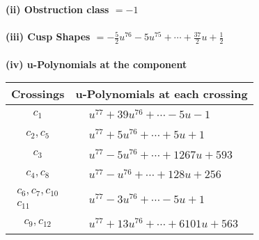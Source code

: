 \documentclass[1p]{elsarticle_modified}
\theoremstyle{definition}
\begin{document}
\flushleft \textbf{(ii) Obstruction class $= -1$}\\~\\
\flushleft \textbf{(iii) Cusp Shapes $= -\frac{5}{2} u^{76}-5 u^{75}+\cdots+\frac{37}{2} u+\frac{1}{2}$}\\~\\
\newpage\renewcommand{\arraystretch}{1}
\flushleft \textbf{(iv) u-Polynomials at the component}\newline \\
\begin{tabular}{m{50pt}|m{274pt}}
Crossings & \hspace{64pt}u-Polynomials at each crossing \\
\hline $$\begin{aligned}c_{1}\end{aligned}$$&$\begin{aligned}
&u^{77}+39 u^{76}+\cdots-5 u-1
\end{aligned}$\\
\hline $$\begin{aligned}c_{2},c_{5}\end{aligned}$$&$\begin{aligned}
&u^{77}+5 u^{76}+\cdots+5 u+1
\end{aligned}$\\
\hline $$\begin{aligned}c_{3}\end{aligned}$$&$\begin{aligned}
&u^{77}-5 u^{76}+\cdots+1267 u+593
\end{aligned}$\\
\hline $$\begin{aligned}c_{4},c_{8}\end{aligned}$$&$\begin{aligned}
&u^{77}- u^{76}+\cdots+128 u+256
\end{aligned}$\\
\hline $$\begin{aligned}c_{6},c_{7},c_{10}\\c_{11}\end{aligned}$$&$\begin{aligned}
&u^{77}-3 u^{76}+\cdots-5 u+1
\end{aligned}$\\
\hline $$\begin{aligned}c_{9},c_{12}\end{aligned}$$&$\begin{aligned}
&u^{77}+13 u^{76}+\cdots+6101 u+563
\end{aligned}$\\
\hline
\end{tabular}\\~\\
\end{document}
